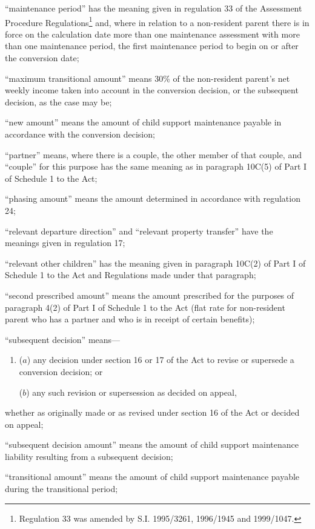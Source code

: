 \documentclass[12pt,a4paper]{article}
\begin{document}
\begin{enumerate}
“maintenance period” has the meaning given in regulation 33 of the Assessment Procedure Regulations\footnote{\frenchspacing Regulation 33 was amended by S.I. 1995/3261, 1996/1945 and 1999/1047.} and, where in relation to a non-resident parent there is in force on the calculation date more than one maintenance assessment with more than one maintenance period, the first maintenance period to begin on or after the conversion date;

“maximum transitional amount” means 30\% of the non-resident parent’s net weekly income taken into account in the conversion decision, or the subsequent decision, as the case may be;

“new amount” means the amount of child support maintenance payable in accordance with the conversion decision;

“partner” means, where there is a couple, the other member of that couple, and “couple” for this purpose has the same meaning as in paragraph 10C(5) of Part I of Schedule 1 to the Act;

“phasing amount” means the amount determined in accordance with regulation 24;

“relevant departure direction” and “relevant property transfer” have the meanings given in regulation 17;

“relevant other children” has the meaning given in paragraph 10C(2) of Part I of Schedule 1 to the Act and Regulations made under that paragraph;

“second prescribed amount” means the amount prescribed for the purposes of paragraph 4(2) of Part I of Schedule 1 to the Act (flat rate for non-resident parent who has a partner and who is in receipt of certain benefits);

“subsequent decision” means—
\begin{enumerate}\item[]
($a$) 
any decision under section 16 or 17 of the Act to revise or supersede a conversion decision; or

($b$) 
any such revision or supersession as decided on appeal,
\end{enumerate}
whether as originally made or as revised under section 16 of the Act or decided on appeal;

“subsequent decision amount” means the amount of child support maintenance liability resulting from a subsequent decision;

“transitional amount” means the amount of child support maintenance payable during the transitional period;


\end{enumerate}
\end{document}
